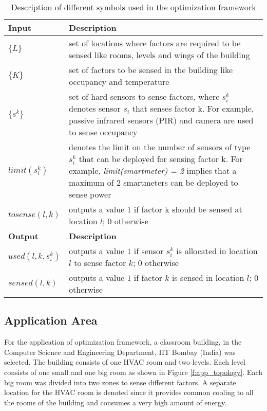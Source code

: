 \documentclass{article}
\begin{document}
\begin{table}[h]
	\caption{Description of different symbols used in the optimization framework}
	\centering
	\begin{tabular}{p{}|p{}}
		\hline
		\textbf{Input} & \textbf{Description}
		\\ \hline
		$\{L\}$                           & set of locations where factors are required to be sensed like rooms, levels and wings of the building
		\\ \hline
		$ \{K\} $                         & set of factors to be sensed in the building like occupancy and temperature
		\\ \hline
		$\{s^k\}$ & set of hard sensors to sense factors, where $s_i^k$ denotes sensor $s_i$ that senses factor k. For example, passive infrared sensors (PIR) and camera are used to sense occupancy
		\\ \hline
		$limit(s_i^k)$ & denotes the limit on the number of sensors of type $s_i^k$ that can be deployed for sensing factor k. For example, \textit{limit(smartmeter) = 2} implies that a maximum of 2 smartmeters can be deployed to sense power
		\\ \hline
		$tosense(l,k)$ & outputs a value 
		1 if factor k should be sensed at location $l$; 0 otherwise
		\\ \hline
		\textbf{Output} & \textbf{Description} 
		\\ \hline
		$used(l,k,s_i^k)$  &  outputs a value $1$ if sensor $s_i^k$ is allocated in location $l$ to sense factor $k$; $0$ otherwise 
		\\ \hline
		$sensed(l,k)$    & outputs a value $1$ if factor $k$ is sensed in location $l$; $0$ otherwise
		\\ \hline
	\end{tabular}
	\label{tab:var}
\end{table}

\subsection{Application Area}

For the application of optimization framework, a classroom building, in  
the Computer Science and Engineering Department, IIT Bombay (India) was selected. The building consists of one HVAC room and two levels. Each level consists of one small and one big room as shown in Figure \ref{f:app_topology}. Each big room was divided into two zones to sense different factors. A separate location for the HVAC room is denoted since it provides common cooling to all the rooms of the building and consumes a very high amount of energy. 
\end{document}
